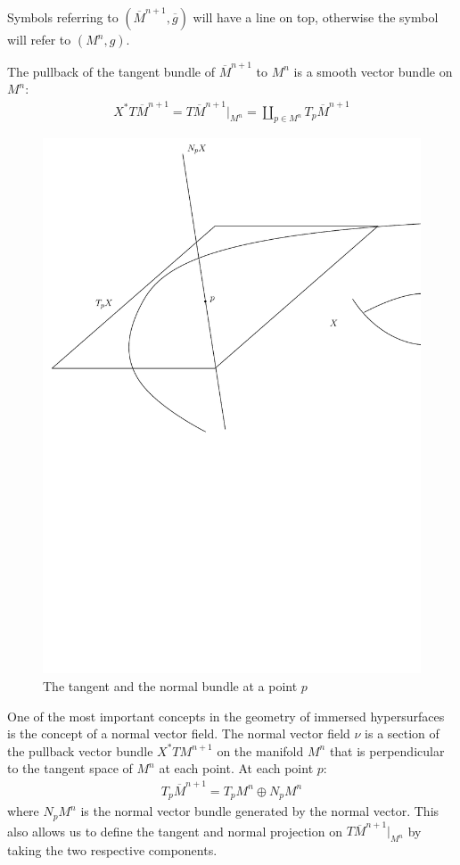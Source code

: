 Symbols referring to $(\overline{M}^{n+1}, \overline{g})$ will have a line on top, otherwise the symbol will refer to $(M^{n}, g)$.


The pullback of the tangent bundle of $\overline{M}^{n+1}$ to
$M^{n}$ is a smooth vector bundle on $M^{n}$:
\begin{align*}
	X^{*}T\overline{M}^{n+1}=T\overline{M}^{n+1}|_{M^n}= \amalg_{p \in M^n} T_p\overline{M}^{n+1}
\end{align*} 

\begin{figure}
	\centering
	\includegraphics[width=\textwidth]{figures/2_tangent_and_normal_bundles}
	\caption{The tangent and the normal bundle at a point $p$}
\end{figure}


One of the most important concepts in the geometry of immersed hypersurfaces is the concept of a normal vector field. The normal vector field $\nu$ is a section of the pullback vector bundle $X^* TM^{n+1}$ on the manifold $M^n$ that is perpendicular to the tangent space of $M^n$ at each point. At each point $p$:
\begin{align*}
	T_p\overline{M}^{n+1}=T_pM^{n}\oplus N_pM^{n}
\end{align*} 
where $N_pM^{n}$ is the normal vector bundle generated by the normal vector. This also allows us to define the tangent and normal projection on $T\overline{M}^{n+1}|_{M^n}$ by taking the two respective components. 

